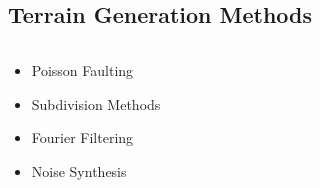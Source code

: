 \documentclass[aspectratio=169]{beamer}
\newenvironment{myframe}[1][t]{\begin{frame}[#1]{\secname}{\subsecname}}{\end{frame}}
\begin{document}
	\subsection{Terrain Generation Methods}
	
	\begin{myframe}
		\begin{columns}[T]
			\begin{column}{0.45\linewidth}
				\begin{itemize}
					\item Poisson Faulting
					\item Subdivision Methods
					\item Fourier Filtering
					\item Noise Synthesis
				\end{itemize}
			\end{column}
			
			\begin{column}{0.5\linewidth}
			\end{column}
		\end{columns}
	\end{myframe}
	
\end{document}
